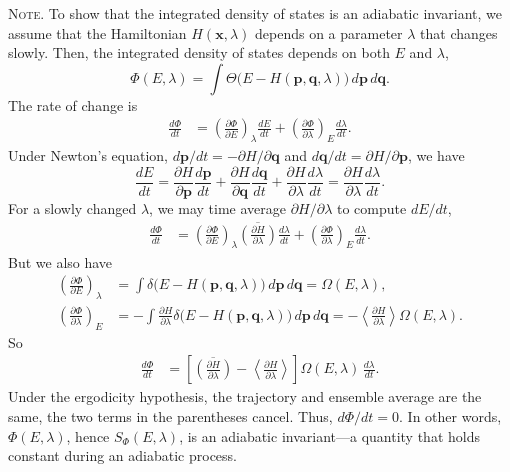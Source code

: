 \documentclass[reprint]{revtex4-1}
\newcommand{\note}[1]{{\color{DarkGreen}\footnotesize \textsc{Note.} #1}}
\begin{document}
\note{
  To show that
  the integrated density of states
  is an adiabatic invariant,
  we assume that
  the Hamiltonian $H(\mathbf x, \lambda)$
  depends on a parameter $\lambda$
  that changes slowly.
  Then, the integrated density of states
  depends on both $E$ and $\lambda$,
  $$
  \Phi(E, \lambda)
  =
  \int \Theta\bigl(
    E - H(\mathbf p, \mathbf q, \lambda)
  \bigr)
  \, d\mathbf p \, d\mathbf q
  .
  $$
  The rate of change is
  \begin{align*}
  \frac{ d \Phi } { dt }
  &=
  \left(
    \frac{ \partial \Phi } { \partial E }
  \right)_\lambda
  \frac{ dE } { dt }
  +
  \left(
    \frac{ \partial \Phi } { \partial \lambda }
  \right)_E
  \frac{ d\lambda } { dt }
  .
  \end{align*}
  Under Newton's equation,
  $d\mathbf p/dt = -\partial H/\partial \mathbf q$
  and
  $d\mathbf q/dt = \partial H/\partial \mathbf p$,
  we have
  $$
  \frac{ dE } { dt }
  =
  \frac{ \partial H } { \partial \mathbf p }
  \frac{ d \mathbf p } { d t }
  +
  \frac{ \partial H } { \partial \mathbf q }
  \frac{ d \mathbf q } { d t }
  +
  \frac{ \partial H } { \partial \lambda }
  \frac{ d \lambda } { dt }
  =
  \frac{ \partial H } { \partial \lambda }
  \frac{ d \lambda } { dt }
  .
  $$
  For a slowly changed $\lambda$,
  we may time average $\partial H / \partial \lambda$
  to compute $dE/dt$,
  \begin{align*}
  \frac{ d \Phi } { dt }
  &=
  \left(
    \frac{ \partial \Phi } { \partial E }
  \right)_\lambda
  \overline{
    \left(
    \frac{ \partial H } { \partial \lambda }
    \right)
  }
  \frac{ d\lambda } { dt }
  +
  \left(
    \frac{ \partial \Phi } { \partial \lambda }
  \right)_E
  \frac{ d\lambda } { dt }
  .
  \end{align*}
  But we also have
  \begin{align*}
  \left(
    \frac{ \partial \Phi } { \partial E }
  \right)_\lambda
  &=
  \int
  \delta\bigl(
    E - H(\mathbf p, \mathbf q, \lambda)
  \bigr)
  \, d\mathbf p \, d\mathbf q
  =
  \Omega(E, \lambda)
  ,
  \\
  \left(
    \frac{ \partial \Phi } { \partial \lambda }
  \right)_E
  &=
  -\int
  \frac{ \partial H } { \partial \lambda }
  \delta\bigl(
    E - H(\mathbf p, \mathbf q, \lambda)
  \bigr)
  \, d\mathbf p \, d\mathbf q
  =
  -\left\langle
    \frac{ \partial H } { \partial \lambda }
  \right\rangle
  \Omega(E, \lambda)
  .
  \end{align*}
  So
  \begin{align*}
  \frac{ d \Phi } { dt }
  &=
  \left[
    \overline{
      \left(
        \frac{ \partial H } { \partial \lambda }
      \right)
    }
    -
    \left\langle
      \frac{ \partial H } { \partial \lambda }
    \right\rangle
  \right]
  \Omega(E, \lambda) \,
  \frac{ d\lambda } { dt }
  .
  \end{align*}
  Under the ergodicity hypothesis,
  the trajectory and ensemble average
  are the same,
  the two terms in the parentheses cancel.
  Thus, $d\Phi/dt = 0$.
  In other words,
  $\Phi(E, \lambda)$, hence $S_\Phi(E, \lambda)$,
  is an adiabatic invariant---a quantity that holds constant
  during an adiabatic process.
}
\end{document}
